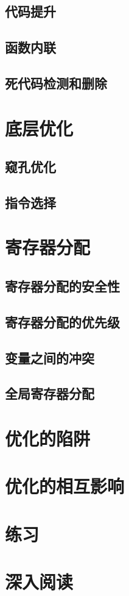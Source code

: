 \documentclass[cn,11pt,chinese]{elegantbook}
\begin{document}
\subsection{代码提升}

\subsection{函数内联}

\subsection{死代码检测和删除}

\section{底层优化}

\subsection{窥孔优化}

\subsection{指令选择}

\section{寄存器分配}

\subsection{寄存器分配的安全性}

\subsection{寄存器分配的优先级}

\subsection{变量之间的冲突}

\subsection{全局寄存器分配}

\section{优化的陷阱}

\section{优化的相互影响}

\section{练习}

\section{深入阅读}
\end{document}
